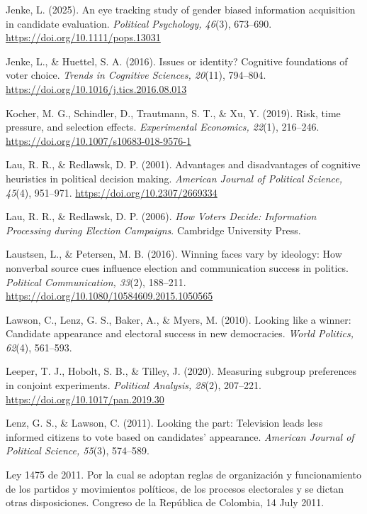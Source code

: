 \documentclass[11pt]{article}\usepackage[]{graphicx}\usepackage[]{xcolor}
\begin{document}
{\begin{list}{}{%
  \setlength{\leftmargin}{1.5em}%
  \setlength{\itemindent}{-1.5em}%
  \setlength{\itemsep}{0pt}%
  \setlength{\parsep}{0pt}%
  \setlength{\topsep}{1pt}%
}
\item Jenke, L. (2025). An eye tracking study of gender biased information acquisition in candidate evaluation. \emph{Political Psychology, 46}(3), 673--690. \url{https://doi.org/10.1111/pops.13031}

\item Jenke, L., \& Huettel, S. A. (2016). Issues or identity? Cognitive foundations of voter choice. \emph{Trends in Cognitive Sciences, 20}(11), 794--804. \url{https://doi.org/10.1016/j.tics.2016.08.013}

\item Kocher, M. G., Schindler, D., Trautmann, S. T., \& Xu, Y. (2019). Risk, time pressure, and selection effects. \emph{Experimental Economics, 22}(1), 216--246. \url{https://doi.org/10.1007/s10683-018-9576-1}

\item Lau, R. R., \& Redlawsk, D. P. (2001). Advantages and disadvantages of cognitive heuristics in political decision making. \emph{American Journal of Political Science, 45}(4), 951--971. \url{https://doi.org/10.2307/2669334}

\item Lau, R. R., \& Redlawsk, D. P. (2006). \emph{How Voters Decide: Information Processing during Election Campaigns}. Cambridge University Press.

\item Laustsen, L., \& Petersen, M. B. (2016). Winning faces vary by ideology: How nonverbal source cues influence election and communication success in politics. \emph{Political Communication, 33}(2), 188--211. \url{https://doi.org/10.1080/10584609.2015.1050565}

\item Lawson, C., Lenz, G. S., Baker, A., \& Myers, M. (2010). Looking like a winner: Candidate appearance and electoral success in new democracies. \emph{World Politics, 62}(4), 561--593.

\item Leeper, T. J., Hobolt, S. B., \& Tilley, J. (2020). Measuring subgroup preferences in conjoint experiments. \emph{Political Analysis, 28}(2), 207--221. \url{https://doi.org/10.1017/pan.2019.30}

\item Lenz, G. S., \& Lawson, C. (2011). Looking the part: Television leads less informed citizens to vote based on candidates' appearance. \emph{American Journal of Political Science, 55}(3), 574--589.

\item Ley 1475 de 2011. Por la cual se adoptan reglas de organizaci\'on y funcionamiento de los partidos y movimientos pol\'iticos, de los procesos electorales y se dictan otras disposiciones. Congreso de la Rep\'ublica de Colombia, 14 July 2011.


\end{list}}
\end{document}
